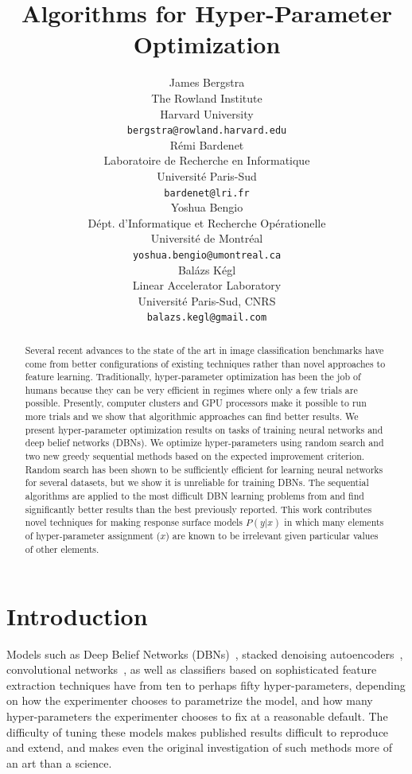 \documentclass{article}
\title{Algorithms for Hyper-Parameter Optimization}
\author{
James Bergstra\\ %
The Rowland Institute\\
Harvard University\\
\texttt{bergstra@rowland.harvard.edu} \\
\And
R{\'e}mi Bardenet \\
Laboratoire de Recherche en Informatique\\
Universit{\'e} Paris-Sud \\
\texttt{bardenet@lri.fr} \\
\AND
Yoshua Bengio \\
D{\'e}pt. d'Informatique et Recherche Op{\'e}rationelle \\
Universit{\'e} de Montr{\'e}al\\
\texttt{yoshua.bengio@umontreal.ca} \\
\And
Bal{\'a}zs K{\'e}gl \\
Linear Accelerator Laboratory \\
Universit{\'e} Paris-Sud, CNRS \\
\texttt{balazs.kegl@gmail.com}
}
\newcommand{\vs}[1]{\vspace*{-#1mm}}
\newcommand{\Bs}{\vs{2}}
\newcommand{\as}{\vs{1}}
\begin{document}
\maketitle
\begin{abstract}
\vs{2}
    Several recent advances to the state of the art in image classification benchmarks have come
    from better configurations of existing techniques rather than novel approaches to
    feature learning.
    Traditionally,
    hyper-parameter optimization has been the job of humans because they can be very efficient in regimes where only a few trials are possible.
    Presently, computer clusters and GPU processors make it possible to run more trials
    and we show that algorithmic approaches can find better results.
    We present hyper-parameter optimization results on tasks of training neural networks and deep belief networks (DBNs).
    We optimize hyper-parameters using random search
    and two new greedy sequential methods based on the expected improvement criterion.
    Random search has been shown to be sufficiently efficient for learning neural networks for several datasets,
    but we show it is unreliable for training DBNs.
    The sequential algorithms are applied to the most difficult DBN learning problems from
    \cite{Larochelle+etal:2007} and find significantly better results than the best previously reported.
    This work contributes novel techniques for making response surface models
    $P(y|x)$ in which many elements of hyper-parameter assignment ($x$) are known to be irrelevant
    given particular values of other elements.
\vs{3}
\end{abstract}

\Bs
\section{Introduction}
\as

Models such as Deep Belief Networks (DBNs)~\citep{hinton+osindero+teh:2006},
stacked denoising autoencoders~\citep{vincent+larochelle+lajoie+bengio+manzagol:2010},
convolutional networks~\citep{lecun+bottou+bengio+haffner:1998},
as well as classifiers based on sophisticated feature extraction techniques %
have from ten to perhaps fifty hyper-parameters, depending on how
the experimenter chooses to parametrize the model, and how many
hyper-parameters the experimenter chooses to fix at a reasonable default.
The difficulty of tuning these models makes published results difficult to
reproduce and extend, and makes even the original investigation of such methods more
of an art than a science.
\end{document}
